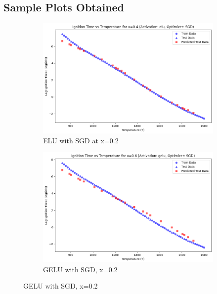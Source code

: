 \documentclass[12pt]{report}
\begin{document}
\subsection{Sample Plots Obtained}

\begin{figure}[H]
    \centering
    \begin{subfigure}[t]{0.48\textwidth}
        \centering
        \includegraphics[width=\textwidth, keepaspectratio]{elu_sgd_04.png}
        \caption{ELU with SGD at x=0.2}
    \end{subfigure}
    \hfill
    \begin{subfigure}[t]{0.48\textwidth}
        \centering
        \includegraphics[width=\textwidth, keepaspectratio]{gelu_sgd_06.png}
        \caption{GELU with SGD, x=0.2}
    \end{subfigure}
\end{figure}
\end{document}
